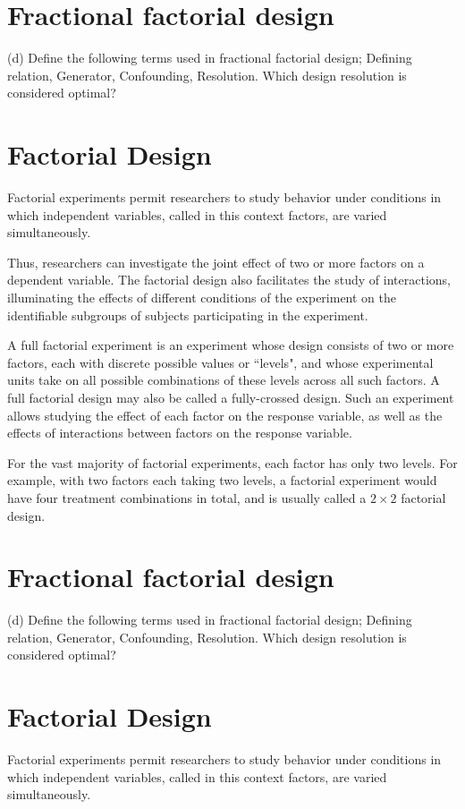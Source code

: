 \documentclass[]{article}
\begin{document}
\section{Fractional factorial design}

(d)	Define the following terms used in fractional factorial design; Defining relation,
Generator, Confounding, Resolution. Which design resolution is considered
optimal?
\section{Factorial Design}
Factorial experiments permit researchers to study behavior under conditions in which independent variables, called in this context factors, are varied simultaneously.

Thus, researchers can investigate the joint effect of two or more factors on a dependent variable. The factorial design also facilitates the study of interactions, illuminating the effects of different conditions of the experiment on the identifiable subgroups of subjects participating in the experiment.


A full factorial experiment is an experiment whose design consists of two or more factors, each with discrete possible values or ``levels", and whose experimental units take on all possible combinations of these levels across all such factors. A full factorial design may also be called a fully-crossed design. Such an experiment allows studying the effect of each factor on the response variable, as well as the effects of interactions between factors on the response variable.

For the vast majority of factorial experiments, each factor has only two levels. For example, with two factors each taking two levels, a factorial experiment would have four treatment combinations in total, and is usually called a $2\times2$ factorial design.

\newpage
\section{Fractional factorial design}

(d)	Define the following terms used in fractional factorial design; Defining relation,
Generator, Confounding, Resolution. Which design resolution is considered
optimal?
\section{Factorial Design}
Factorial experiments permit researchers to study behavior under conditions in which independent variables, called in this context factors, are varied simultaneously.
\end{document}
